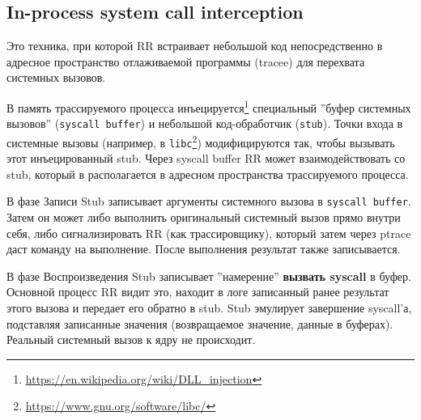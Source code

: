 


\subsection{In-process system call interception}


Это техника, при которой RR встраивает небольшой код непосредственно
в адресное пространство отлаживаемой программы (tracee) для перехвата системных
вызовов.

В память трассируемого процесса
инъецируется\footnote{\url{https://en.wikipedia.org/wiki/DLL_injection}}
специальный ''буфер системных вызовов'' (\texttt{syscall buffer}) и небольшой
код-обработчик (\texttt{stub}). Точки входа в системные вызовы (например, в
\texttt{libc}\footnote{\url{https://www.gnu.org/software/libc/}})
модифицируются так, чтобы вызывать этот инъецированный stub. Через syscall
buffer RR может взаимодействовать со stub, который в располагается в адресном
пространства трассируемого процесса.

В фазе Записи Stub записывает аргументы системного вызова в \texttt{syscall
buffer}. Затем он может либо выполнить оригинальный системный вызов прямо
внутри себя, либо сигнализировать RR (как трассировщику), который затем через
ptrace даст команду на выполнение. После выполнения результат также
записывается.

В фазе Воспроизведения Stub записывает ''намерение'' \textbf{вызвать syscall} в буфер.
Основной процесс RR видит это, находит в логе записанный ранее результат этого
вызова и передает его обратно в stub. Stub эмулирует завершение syscall'а,
подставляя записанные значения (возвращаемое значение, данные в буферах).
Реальный системный вызов к ядру не происходит.

